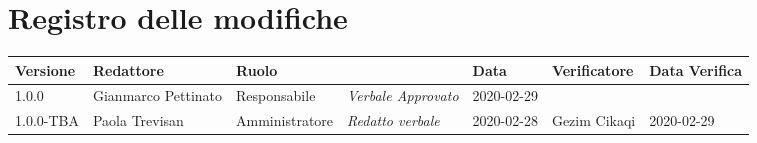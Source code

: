\section*{Registro delle modifiche}
\renewcommand{\arraystretch}{1.8}

  \setlength\LTleft{-1.7cm}
  \begin{longtable}{|p{1.7cm}|p{2cm}|p{2.5cm}|p{3cm}|p{1.7cm}|p{2cm}|p{2.3cm}|}
    \hline

    \rowcolor{header}
    \textbf{Versione} & \textbf{Redattore} & \textbf{Ruolo} & \centering{\textbf{Descrizione}} & \textbf{Data} & \textbf{Verificatore} & \textbf{Data Verifica}\\

    \hline
    1.0.0 & Gianmarco Pettinato & Responsabile & \small{\textit{Verbale Approvato}} & 2020-02-29 & &\\
	  1.0.0-TBA & Paola Trevisan & Amministratore & \small{\textit{Redatto verbale}} & 2020-02-28 & Gezim Cikaqi & 2020-02-29 \\
    \hline
  \end{longtable}
  \setlength\LTleft{0cm}
